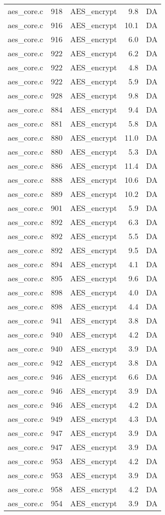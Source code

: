 \begin{table}[h!]
\begin{tabular}{lrlrr}
aes\_core.c& 918&AES\_encrypt&9.8 &DA\\
aes\_core.c& 916&AES\_encrypt&10.1 &DA\\
aes\_core.c& 916&AES\_encrypt&6.0 &DA\\
aes\_core.c& 922&AES\_encrypt&6.2 &DA\\
aes\_core.c& 922&AES\_encrypt&4.8 &DA\\
aes\_core.c& 922&AES\_encrypt&5.9 &DA\\
aes\_core.c& 928&AES\_encrypt&9.8 &DA\\
aes\_core.c& 884&AES\_encrypt&9.4 &DA\\
aes\_core.c& 881&AES\_encrypt&5.8 &DA\\
aes\_core.c& 880&AES\_encrypt&11.0 &DA\\
aes\_core.c& 880&AES\_encrypt&5.3 &DA\\
aes\_core.c& 886&AES\_encrypt&11.4 &DA\\
aes\_core.c& 888&AES\_encrypt&10.6 &DA\\
aes\_core.c& 889&AES\_encrypt&10.2 &DA\\
aes\_core.c& 901&AES\_encrypt&5.9 &DA\\
aes\_core.c& 892&AES\_encrypt&6.3 &DA\\
aes\_core.c& 892&AES\_encrypt&5.5 &DA\\
aes\_core.c& 892&AES\_encrypt&9.5 &DA\\
aes\_core.c& 894&AES\_encrypt&4.1 &DA\\
aes\_core.c& 895&AES\_encrypt&9.6 &DA\\
aes\_core.c& 898&AES\_encrypt&4.0 &DA\\
aes\_core.c& 898&AES\_encrypt&4.4 &DA\\
aes\_core.c& 941&AES\_encrypt&3.8 &DA\\
aes\_core.c& 940&AES\_encrypt&4.2 &DA\\
aes\_core.c& 940&AES\_encrypt&3.9 &DA\\
aes\_core.c& 942&AES\_encrypt&3.8 &DA\\
aes\_core.c& 946&AES\_encrypt&6.6 &DA\\
aes\_core.c& 946&AES\_encrypt&3.9 &DA\\
aes\_core.c& 946&AES\_encrypt&4.2 &DA\\
aes\_core.c& 949&AES\_encrypt&4.3 &DA\\
aes\_core.c& 947&AES\_encrypt&3.9 &DA\\
aes\_core.c& 947&AES\_encrypt&3.9 &DA\\
aes\_core.c& 953&AES\_encrypt&4.2 &DA\\
aes\_core.c& 953&AES\_encrypt&3.9 &DA\\
aes\_core.c& 958&AES\_encrypt&4.2 &DA\\
aes\_core.c& 954&AES\_encrypt&3.9 &DA\\
\hline
\end{tabular}
\renewcommand{\baselinestretch}{1.0}\selectfont
\end{table}
